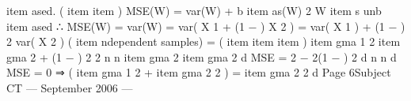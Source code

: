 item ased.
(%
item %
item )
MSE(W) = var(W) + {b%
item as(W)} 2
W %
item s unb%
item ased
∴ MSE(W) = var(W)
= var( \alpha X 1 + (1 − \alpha ) X 2 )
=  var( X 1 ) + (1 − \alpha ) 2 var( X 2 ) (%
item ndependent samples)
= 
(%
item %
item %
item )
\s%
item gma 1 2
\s%
item gma 2
+ (1 − \alpha ) 2 2
n
n
\s%
item gma 2
\s%
item gma 2
d MSE
= 2  − 2(1 − \alpha ) 2
d \alpha
n
n
d MSE
= 0 ⇒ ( \s%
item gma 1 2 + \s%
item gma 2 2 ) \alpha = \s%
item gma 2 2
d \alpha
Page 6Subject CT  — September 2006 — 

